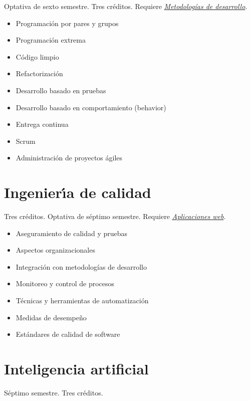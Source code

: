 \documentclass{article}
\begin{document}
\begin{multicols}{4}
Optativa de sexto semestre. Tres cr\'{e}ditos. Requiere
\hyperlink{mdd}{\em Metodolog\'{i}as de desarrollo}.

\begin{itemize}
\item{Programaci\'{o}n por pares y grupos}
\item{Programaci\'{o}n extrema}
\item{C\'{o}digo limpio}
\item{Refactorizaci\'{o}n}
  \item{Desarrollo basado en pruebas}
\item{Desarrollo basado en comportamiento (behavior)}
\item{Entrega continua}
\item{Scrum}
\item{Administraci\'{o}n de proyectos \'{a}giles}
\end{itemize}

\vfill\null \columnbreak

\hypertarget{idc}{\section*{Ingenier\'{\i}a de calidad}} 

Tres cr\'{e}ditos. Optativa de s\'{e}ptimo semestre. Requiere
\hyperlink{aw}{\em Aplicaciones web}.

\begin{itemize}
\item{Aseguramiento de calidad y pruebas}
\item{Aspectos organizacionales}
\item{Integraci\'{o}n con metodolog\'{i}as de desarrollo}
\item{Monitoreo y control de procesos}
\item{T\'{e}cnicas y herramientas de automatizaci\'{o}n}
\item{Medidas de desempe\~{n}o}
\item{Est\'{a}ndares de calidad de software}
\end{itemize}

\newpage

\hypertarget{ia}{\section*{Inteligencia artificial}}

S\'{e}ptimo semestre. Tres cr\'{e}ditos.


\end{multicols}
\end{document}
